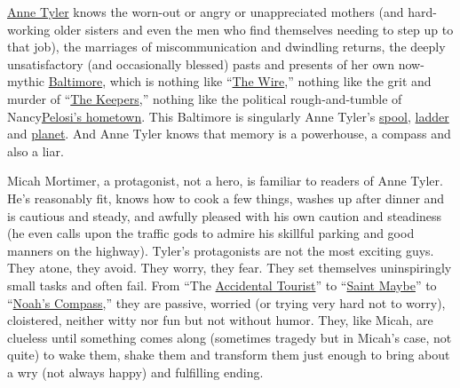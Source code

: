 \href{https://www.nytimes3xbfgragh.onion/2018/07/05/books/anne-tyler-clock-dance.html}{Anne
Tyler} knows the worn-out or angry or unappreciated mothers (and
hard-working older sisters and even the men who find themselves needing
to step up to that job), the marriages of miscommunication and dwindling
returns, the deeply unsatisfactory (and occasionally blessed) pasts and
presents of her own now-mythic
\href{https://www.nytimes3xbfgragh.onion/2019/03/22/t-magazine/baltimore-artists-art-culture.html}{Baltimore},
which is nothing like
``\href{https://www.nytimes3xbfgragh.onion/watching/recommendations/watching-tv-the-wire}{The
Wire},'' nothing like the grit and murder of
``\href{https://www.nytimes3xbfgragh.onion/2017/05/18/arts/television/review-the-keepers-netflix.html}{The
Keepers},'' nothing like the political rough-and-tumble of
Nancy\href{https://www.nytimes3xbfgragh.onion/2019/01/12/opinion/sunday/dowd-nancy-pelosi-donald-trump.html}{Pelosi's
hometown}. This Baltimore is singularly Anne Tyler's
\href{https://www.nytimes3xbfgragh.onion/2015/02/06/books/anne-tylers-20th-novel-a-spool-of-blue-thread.html}{spool},
\href{http://movies2.nytimes3xbfgragh.onion/books/98/04/19/specials/tyler-ladder.html}{ladder}
and
\href{https://archive.nytimes3xbfgragh.onion/www.nytimes3xbfgragh.onion/books/98/04/19/reviews/980419.19shieldt.html}{planet}.
And Anne Tyler knows that memory is a powerhouse, a compass and also a
liar.

Micah Mortimer, a protagonist, not a hero, is familiar to readers of
Anne Tyler. He's reasonably fit, knows how to cook a few things, washes
up after dinner and is cautious and steady, and awfully pleased with his
own caution and steadiness (he even calls upon the traffic gods to
admire his skillful parking and good manners on the highway). Tyler's
protagonists are not the most exciting guys. They atone, they avoid.
They worry, they fear. They set themselves uninspiringly small tasks and
often fail. From ``The
\href{https://www.nytimes3xbfgragh.onion/1985/09/08/books/the-accidental-tourist.html}{Accidental
Tourist}'' to
``\href{https://archive.nytimes3xbfgragh.onion/www.nytimes3xbfgragh.onion/books/98/04/19/specials/tyler-saint.html}{Saint
Maybe}'' to
``\href{https://www.nytimes3xbfgragh.onion/2010/01/03/books/review/Harrison-t.html}{Noah's
Compass},'' they are passive, worried (or trying very hard not to
worry), cloistered, neither witty nor fun but not without humor. They,
like Micah, are clueless until something comes along (sometimes tragedy
but in Micah's case, not quite) to wake them, shake them and transform
them just enough to bring about a wry (not always happy) and fulfilling
ending.

